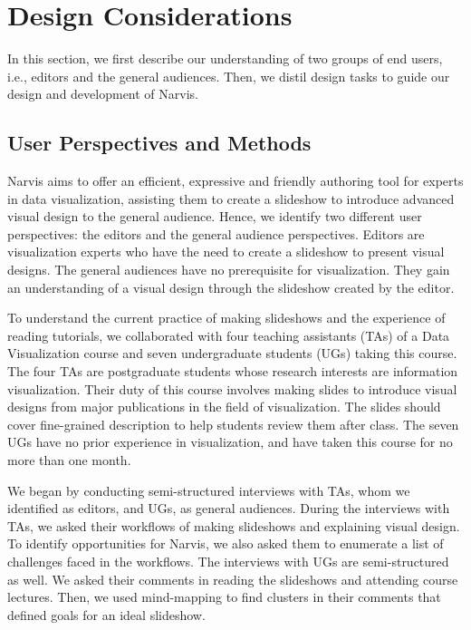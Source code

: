 \section{Design Considerations}\label{sec:design_task}
In this section, we first describe our understanding of two groups of end users, i.e., editors and the general audiences. Then, we distil design tasks to guide our design and development of Narvis.

\subsection{User Perspectives and Methods}

Narvis aims to offer an efficient, expressive and friendly authoring tool for experts in data visualization, assisting them to create a slideshow to introduce advanced visual design to the general audience.  
Hence, we identify two different user perspectives: the editors and the general audience perspectives. Editors are visualization experts who have the need to create a slideshow to present visual designs. The general audiences have no prerequisite for visualization. They gain an understanding of a visual design through the slideshow created by the editor. 

To understand the current practice of making slideshows and the experience of reading tutorials, we collaborated with four teaching assistants (TAs) of a Data Visualization course and seven undergraduate students (UGs) taking this course. The four TAs are postgraduate students whose research interests are information visualization. Their duty of this course involves making slides to introduce visual designs from major publications in the field of visualization. The slides should cover fine-grained description to help students review them after class. The seven UGs have no prior experience in visualization, and have taken this course for no more than one month.  

We began by conducting semi-structured interviews with TAs, whom we identified as editors, and UGs, as general audiences. During the interviews with TAs, we asked their workflows of making slideshows and explaining visual design. To identify opportunities for Narvis, we also asked them to enumerate a list of challenges faced in the workflows. The interviews with UGs are semi-structured as well. We asked their comments in reading the slideshows and attending course lectures. Then, we used mind-mapping to find clusters in their comments that defined goals for an ideal slideshow. 


